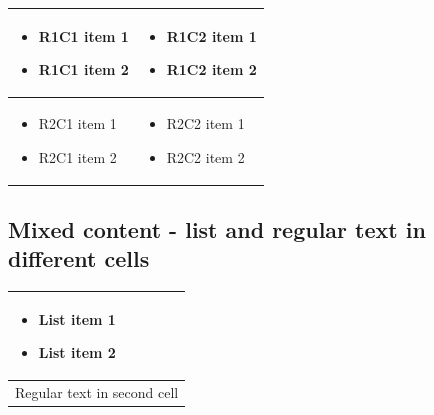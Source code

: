 \documentclass[11pt,a4paper]{article}
\begin{document}
\begin{table}[h]
\begin{tabular}{|l|l|}
\hline
\begin{itemize} \item R1C1 item 1 \item R1C1 item 2 \end{itemize} & \begin{itemize} \item R1C2 item 1 \item R1C2 item 2 \end{itemize} \\ \hline
\begin{itemize} \item R2C1 item 1 \item R2C1 item 2 \end{itemize} & \begin{itemize} \item R2C2 item 1 \item R2C2 item 2 \end{itemize} \\ \hline
\end{tabular}
\end{table}

\subsection{Mixed content - list and regular text in different cells}

\begin{table}[h]
\begin{tabular}{|l|}
\hline
\begin{itemize} \item List item 1 \item List item 2 \end{itemize} \\ \hline
Regular text in second cell \\ \hline
\end{tabular}
\end{table}
\end{document}
